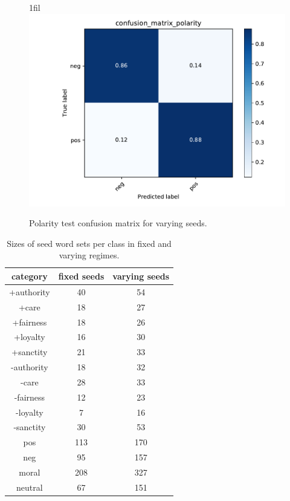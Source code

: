 \documentclass{article}
\makeatletter
\newcommand*{\centerfloat}{%
  \parindent \z@
  \leftskip \z@ \@plus 1fil \@minus \textwidth
  \rightskip\leftskip
  \parfillskip \z@skip}
\makeatother
\begin{document}
\begin{figure}[H]
    \centerfloat
    \includegraphics[width=1.5\linewidth]{confusion-matrix-centroid-varying-seeds/confusion_matrix_polarity.pdf}
    \caption{Polarity test confusion matrix for varying seeds.}
    \label{fig:confusion-polarity-varying}
\end{figure}

\begin{table}[H]
    \centering
    \caption{Sizes of seed word sets per class in fixed and varying regimes.}
    \begin{tabular}{c | c | c}
        \textbf{category}   & \textbf{fixed seeds} & \textbf{varying seeds} \\ \hline
        +authority &    40       &     54        \\
        +care      &    18       &     27        \\
        +fairness  &    18       &     26        \\
        +loyalty   &    16       &     30        \\
        +sanctity  &    21       &     33        \\ \hline
        -authority &    18       &     32        \\
        -care      &    28       &     33        \\
        -fairness  &    12       &     23        \\
        -loyalty   &    7        &     16        \\
        -sanctity  &    30       &     53        \\ \hline
        pos        &    113      &     170       \\
        neg        &    95       &     157       \\ \hline
        moral      &    208      &     327       \\
        neutral    &    67       &     151       \\
    \end{tabular}
    \label{tab:sizes}
\end{table}
\end{document}
